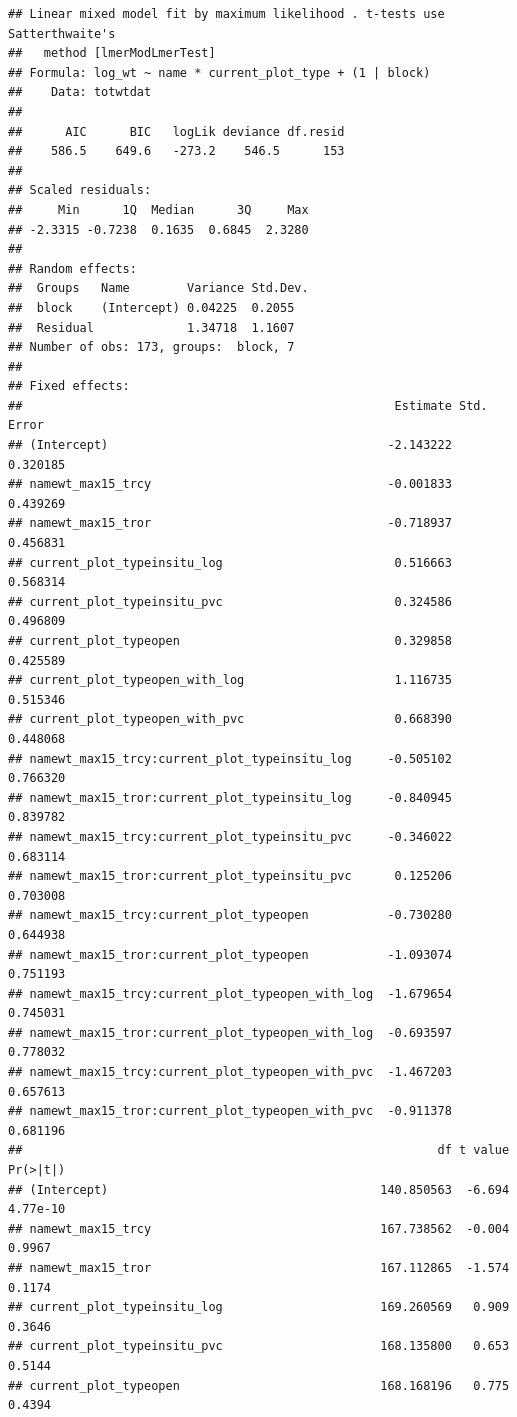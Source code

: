 \documentclass[
]{article}
\begin{document}
\begin{verbatim}
## Linear mixed model fit by maximum likelihood . t-tests use Satterthwaite's
##   method [lmerModLmerTest]
## Formula: log_wt ~ name * current_plot_type + (1 | block)
##    Data: totwtdat
## 
##      AIC      BIC   logLik deviance df.resid 
##    586.5    649.6   -273.2    546.5      153 
## 
## Scaled residuals: 
##     Min      1Q  Median      3Q     Max 
## -2.3315 -0.7238  0.1635  0.6845  2.3280 
## 
## Random effects:
##  Groups   Name        Variance Std.Dev.
##  block    (Intercept) 0.04225  0.2055  
##  Residual             1.34718  1.1607  
## Number of obs: 173, groups:  block, 7
## 
## Fixed effects:
##                                                    Estimate Std. Error
## (Intercept)                                       -2.143222   0.320185
## namewt_max15_trcy                                 -0.001833   0.439269
## namewt_max15_tror                                 -0.718937   0.456831
## current_plot_typeinsitu_log                        0.516663   0.568314
## current_plot_typeinsitu_pvc                        0.324586   0.496809
## current_plot_typeopen                              0.329858   0.425589
## current_plot_typeopen_with_log                     1.116735   0.515346
## current_plot_typeopen_with_pvc                     0.668390   0.448068
## namewt_max15_trcy:current_plot_typeinsitu_log     -0.505102   0.766320
## namewt_max15_tror:current_plot_typeinsitu_log     -0.840945   0.839782
## namewt_max15_trcy:current_plot_typeinsitu_pvc     -0.346022   0.683114
## namewt_max15_tror:current_plot_typeinsitu_pvc      0.125206   0.703008
## namewt_max15_trcy:current_plot_typeopen           -0.730280   0.644938
## namewt_max15_tror:current_plot_typeopen           -1.093074   0.751193
## namewt_max15_trcy:current_plot_typeopen_with_log  -1.679654   0.745031
## namewt_max15_tror:current_plot_typeopen_with_log  -0.693597   0.778032
## namewt_max15_trcy:current_plot_typeopen_with_pvc  -1.467203   0.657613
## namewt_max15_tror:current_plot_typeopen_with_pvc  -0.911378   0.681196
##                                                          df t value Pr(>|t|)
## (Intercept)                                      140.850563  -6.694 4.77e-10
## namewt_max15_trcy                                167.738562  -0.004   0.9967
## namewt_max15_tror                                167.112865  -1.574   0.1174
## current_plot_typeinsitu_log                      169.260569   0.909   0.3646
## current_plot_typeinsitu_pvc                      168.135800   0.653   0.5144
## current_plot_typeopen                            168.168196   0.775   0.4394

\end{verbatim}
\end{document}
